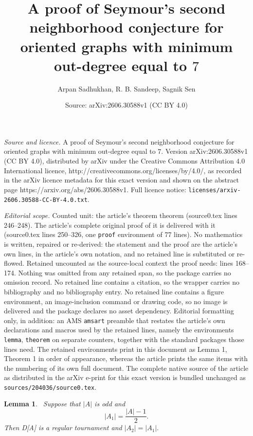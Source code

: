 \documentclass[10pt,a4paper]{amsart}
\title{A proof of Seymour's second neighborhood conjecture for oriented graphs with minimum out-degree equal to \(7\)}
\author{Arpan Sadhukhan, R. B. Sandeep, Sagnik Sen}
\date{Source: arXiv:2606.30588v1 (CC BY 4.0)}
\newtheorem{lemma}{Lemma}
\begin{document}
\maketitle

\noindent\emph{Source and licence.} A proof of Seymour's second neighborhood conjecture for oriented graphs with minimum out-degree equal to \(7\). Version arXiv:2606.30588v1 (CC BY 4.0), distributed by arXiv under the Creative Commons Attribution 4.0 International licence, http://creativecommons.org/licenses/by/4.0/, as recorded in the arXiv licence metadata for this exact version and shown on the abstract page https://arxiv.org/abs/2606.30588v1. Full licence notice: \texttt{licenses/arxiv-2606.30588-CC-BY-4.0.txt}.\par\smallskip

\noindent\textit{Editorial scope.} Counted unit: the article's theorem theorem (source0.tex lines 246--248). The article's complete original proof of it is delivered with it (source0.tex lines 250--326, one \texttt{proof} environment of 77 lines). No mathematics is written, repaired or re-derived: the statement and the proof are the article's own lines, in the article's own notation, and no retained line is substituted or re-flowed.  Retained uncounted as the source-local context the proof needs: lines 168--174.  Nothing was omitted from any retained span, so the package carries no omission record.  No retained line contains a citation, so the wrapper carries no bibliography and no bibliography entry.  No retained line contains a figure environment, an image-inclusion command or drawing code, so no image is delivered and the package declares no asset dependency.  Editorial formatting only, in addition: an AMS \texttt{amsart} preamble that restates the article's own declarations and macros used by the retained lines, namely the environments \texttt{lemma}, \texttt{theorem} on separate counters, together with the standard packages those lines need.  The retained environments print in this document as Lemma 1, Theorem 1 in order of appearance, whereas the article prints the same items with the numbering of its own full document.  The complete native source of the article as distributed in the arXiv e-print for this exact version is bundled unchanged as \texttt{sources/204036/source0.tex}.
\begin{lemma}~\label{lem:perfectdegree}
Suppose that \(|A|\) is odd and
\[
|A_{1}|=\frac{|A|-1}{2}.
\]
Then D[A] is a regular tournament and $|A_2|=|A_{1}|.$
\end{lemma}
\end{document}
